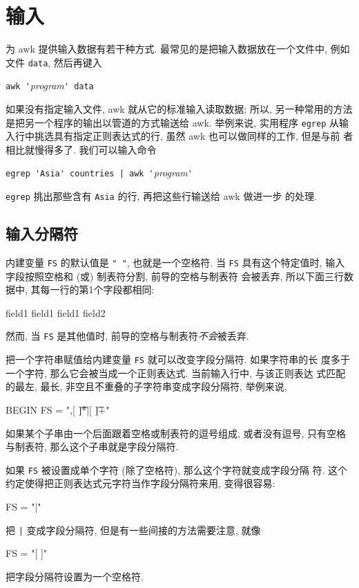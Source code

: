 \section{输入}
\label{sec:input}

为 awk 提供输入数据有若干种方式. 最常见的是把输入数据放在一个文件中, 例如
文件 \verb'data', 然后再键入
\begin{pattern}
    \indent\verb"awk '"\textit{program}\verb"' data"
\end{pattern}

如果没有指定输入文件, awk 就从它的标准输入读取数据; 所以, 另一种常用的方法
是把另一个程序的输出以管道的方式输送给 awk. 举例来说, 实用程序 \verb'egrep'
从输入行中挑选具有指定正则表达式的行, 虽然 awk 也可以做同样的工作, 但是与前
者相比就慢得多了. 我们可以输入命令
\begin{pattern}
    \indent\verb"egrep 'Asia' countries | awk '"\textit{program}\verb"'"
\end{pattern}
\verb'egrep' 挑出那些含有 \verb'Asia' 的行, 再把这些行输送给 awk 做进一步
的处理.

\subsection{输入分隔符}
\label{subsec:input_separators}

内建变量 \verb'FS' 的默认值是 \verb'" "', 也就是一个空格符. 当 \verb'FS'
具有这个特定值时, 输入字段按照空格和 (或) 制表符分割, 前导的空格与制表符
会被丢弃, 所以下面三行数据中, 其每一行的第1个字段都相同:
\begin{myverb}
    field1
      field1
        field1      field2
\end{myverb}
然而, 当 \verb'FS' 是其他值时, 前导的空格与制表符\emph{不会}被丢弃.

把一个字符串赋值给内建变量 \verb'FS' 就可以改变字段分隔符. 如果字符串的长
度多于一个字符, 那么它会被当成一个正则表达式. 当前输入行中, 与该正则表达
式匹配的最左, 最长, 非空且不重叠的子字符串变成字段分隔符, 举例来说,
\begin{myverb}
    BEGIN { FS = ",[ \t]*|[ \t]+" }
\end{myverb}
如果某个子串由一个后面跟着空格或制表符的逗号组成, 或者没有逗号, 只有空格
与制表符, 那么这个子串就是字段分隔符.

如果 \verb'FS' 被设置成单个字符 (除了空格符), 那么这个字符就变成字段分隔
符. 这个约定使得把正则表达式元字符当作字段分隔符来用, 变得很容易:
\begin{myverb}
    FS = "|"
\end{myverb}
把 \verb'|' 变成字段分隔符, 但是有一些间接的方法需要注意, 就像
\begin{myverb}
    FS = "[ ]"
\end{myverb}
把字段分隔符设置为一个空格符.

